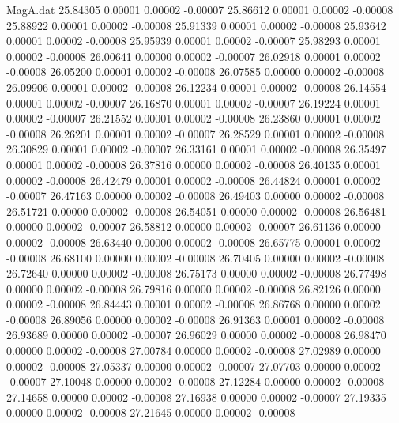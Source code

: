 \begin{filecontents}{MagA.dat}
  25.84305    0.00001    0.00002   -0.00007
  25.86612    0.00001    0.00002   -0.00008
  25.88922    0.00001    0.00002   -0.00008
  25.91339    0.00001    0.00002   -0.00008
  25.93642    0.00001    0.00002   -0.00008
  25.95939    0.00001    0.00002   -0.00007
  25.98293    0.00001    0.00002   -0.00008
  26.00641    0.00000    0.00002   -0.00007
  26.02918    0.00001    0.00002   -0.00008
  26.05200    0.00001    0.00002   -0.00008
  26.07585    0.00000    0.00002   -0.00008
  26.09906    0.00001    0.00002   -0.00008
  26.12234    0.00001    0.00002   -0.00008
  26.14554    0.00001    0.00002   -0.00007
  26.16870    0.00001    0.00002   -0.00007
  26.19224    0.00001    0.00002   -0.00007
  26.21552    0.00001    0.00002   -0.00008
  26.23860    0.00001    0.00002   -0.00008
  26.26201    0.00001    0.00002   -0.00007
  26.28529    0.00001    0.00002   -0.00008
  26.30829    0.00001    0.00002   -0.00007
  26.33161    0.00001    0.00002   -0.00008
  26.35497    0.00001    0.00002   -0.00008
  26.37816    0.00000    0.00002   -0.00008
  26.40135    0.00001    0.00002   -0.00008
  26.42479    0.00001    0.00002   -0.00008
  26.44824    0.00001    0.00002   -0.00007
  26.47163    0.00000    0.00002   -0.00008
  26.49403    0.00000    0.00002   -0.00008
  26.51721    0.00000    0.00002   -0.00008
  26.54051    0.00000    0.00002   -0.00008
  26.56481    0.00000    0.00002   -0.00007
  26.58812    0.00000    0.00002   -0.00007
  26.61136    0.00000    0.00002   -0.00008
  26.63440    0.00000    0.00002   -0.00008
  26.65775    0.00001    0.00002   -0.00008
  26.68100    0.00000    0.00002   -0.00008
  26.70405    0.00000    0.00002   -0.00008
  26.72640    0.00000    0.00002   -0.00008
  26.75173    0.00000    0.00002   -0.00008
  26.77498    0.00000    0.00002   -0.00008
  26.79816    0.00000    0.00002   -0.00008
  26.82126    0.00000    0.00002   -0.00008
  26.84443    0.00001    0.00002   -0.00008
  26.86768    0.00000    0.00002   -0.00008
  26.89056    0.00000    0.00002   -0.00008
  26.91363    0.00001    0.00002   -0.00008
  26.93689    0.00000    0.00002   -0.00007
  26.96029    0.00000    0.00002   -0.00008
  26.98470    0.00000    0.00002   -0.00008
  27.00784    0.00000    0.00002   -0.00008
  27.02989    0.00000    0.00002   -0.00008
  27.05337    0.00000    0.00002   -0.00007
  27.07703    0.00000    0.00002   -0.00007
  27.10048    0.00000    0.00002   -0.00008
  27.12284    0.00000    0.00002   -0.00008
  27.14658    0.00000    0.00002   -0.00008
  27.16938    0.00000    0.00002   -0.00007
  27.19335    0.00000    0.00002   -0.00008
  27.21645    0.00000    0.00002   -0.00008

\end{filecontents}

